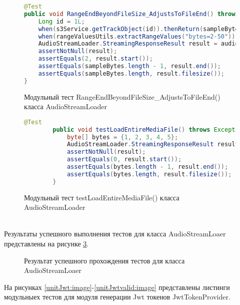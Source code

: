 \begin{figure}[!ht]
	\begin{lstlisting}[language=Java]
	@Test
public void RangeEndBeyondFileSize_AdjustsToFileEnd() throws Exception {
	Long id = 1L;
	when(s3Service.getTrackObject(id)).thenReturn(sampleBytes);
	when(rangeValuesUtils.extractRangeValues("bytes=2-50")).thenReturn(new long[]{2, 50});
	AudioStreamLoader.StreamingResponseResult result = audioStreamLoader.loadPartialMediaFromStorage(id, "bytes=2-50");
	assertNotNull(result);
	assertEquals(2, result.start());
	assertEquals(sampleBytes.length - 1, result.end());
	assertEquals(sampleBytes.length, result.filesize());
}
	\end{lstlisting}  
	\caption{Модульный тест RangeEndBeyondFileSize\_AdjustsToFileEnd() класса AudioStreamLoader}
	\label{unitASLbeyond:image}
\end{figure}
\begin{figure}[!ht]
	\begin{lstlisting}[language=Java]
			@Test
		public void testLoadEntireMediaFile() throws Exception {
			byte[] bytes = {1, 2, 3, 4, 5};
			AudioStreamLoader.StreamingResponseResult result = audioStreamLoader.loadEntireMediaFile(bytes);
			assertNotNull(result);
			assertEquals(0, result.start());
			assertEquals(bytes.length - 1, result.end());
			assertEquals(bytes.length, result.filesize());
		}
	\end{lstlisting}  
\caption{Модульный тест testLoadEntireMediaFile() класса AudioStreamLoader}
\label{unitASLentire:image}
\end{figure}
\\
Результаты успешного выполнения тестов для класса AudioStreamLoaer представлены на рисунке \ref{unitASLSuc:image}.
\begin{figure}[!ht]
	\caption{Результат успешного прохождения тестов для класса AudioStreamLoaer}
	\label{unitASLSuc:image}
\end{figure}
На рисунках \ref{unitJwt:image}-\ref{unitJwtvalid:image} представлены листинги модульныех тестов для модуля генерации Jwt токенов JwtTokenProvider.

